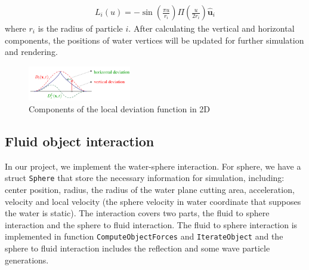 \documentclass[acmtog]{acmart}
\begin{document}
\begin{equation*}
   \begin{aligned}
        L_i(u)=-\sin \left(\frac{\pi u}{r_i} \right) \Pi \left(\frac{u}{2r_i}\right)\hat{\mathbf{u}}_i
    \end{aligned}
\end{equation*}
where $r_{i}$ is the radius of particle $i$.
After calculating the vertical and horizontal components, the positions of water vertices will be updated for further simulation and rendering.
\begin{figure}[!htb]
  \centering
  \includegraphics[width=0.4\textwidth]{image/component.png}
  \caption{Components of the local deviation function in 2D} 
\label{fig:1}
\end{figure}
\subsection{Fluid object interaction}
In our project, we implement the water-sphere interaction. For sphere, we have a struct \verb|Sphere| that store the necessary information for simulation, including: center position, radius, the radius of the water plane cutting area, acceleration, velocity and local velocity (the sphere velocity in water coordinate that supposes the water is static). 
The interaction covers two parts, the fluid to sphere interaction and the sphere to fluid interaction. 
The fluid to sphere interaction is implemented in function \verb|ComputeObjectForces| and \verb|IterateObject| and the sphere to fluid interaction includes the reflection and some wave particle generations.
\end{document}
